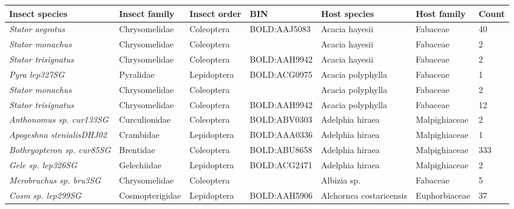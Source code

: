 \documentclass[11pt]{article}
\begin{document}
\begin{landscape}
\begin{longtable}{@{}lllllll@{}}
\toprule
Insect species                                        & Insect family   & Insect order & BIN          & Host species                       & Host family      & Count \\* \midrule
\endhead
%
\bottomrule
\endfoot
%
\endlastfoot
\textit{Stator aegrotus}                              & Chrysomelidae   & Coleoptera   & BOLD:AAJ5083 & Acacia hayesii                     & Fabaceae         & 40    \\
\textit{Stator monachus}                              & Chrysomelidae   & Coleoptera   &              & Acacia hayesii                     & Fabaceae         & 2     \\
\textit{Stator trisignatus}                           & Chrysomelidae   & Coleoptera   & BOLD:AAH9942 & Acacia hayesii                     & Fabaceae         & 2     \\
\textit{Pyra lep327SG}                                & Pyralidae       & Lepidoptera  & BOLD:ACG0975 & Acacia polyphylla                  & Fabaceae         & 1     \\
\textit{Stator monachus}                              & Chrysomelidae   & Coleoptera   &              & Acacia polyphylla                  & Fabaceae         & 2     \\
\textit{Stator trisignatus}                           & Chrysomelidae   & Coleoptera   & BOLD:AAH9942 & Acacia polyphylla                  & Fabaceae         & 12    \\
\textit{Anthonomus sp. cur133SG}                      & Curculionidae   & Coleoptera   & BOLD:ABV0303 & Adelphia hiraea                    & Malpighiaceae    & 2     \\
\textit{Apogeshna stenialisDHJ02}                     & Crambidae       & Lepidoptera  & BOLD:AAA0336 & Adelphia hiraea                    & Malpighiaceae    & 1     \\
\textit{Bothryopteron sp. cur85SG}                    & Brentidae       & Coleoptera   & BOLD:ABU8658 & Adelphia hiraea                    & Malpighiaceae    & 333   \\
\textit{Gele sp. lep326SG}                            & Gelechiidae     & Lepidoptera  & BOLD:ACG2471 & Adelphia hiraea                    & Malpighiaceae    & 2     \\
\textit{Merobruchus sp. bru3SG}                       & Chrysomelidae   & Coleoptera   &              & Albizia sp.                        & Fabaceae         & 5     \\
\textit{Cosm sp. lep299SG}                            & Cosmopterigidae & Lepidoptera  & BOLD:AAH5906 & Alchornea costaricensis            & Euphorbiaceae    & 37    \\

\end{longtable}
\end{landscape}
\end{document}
